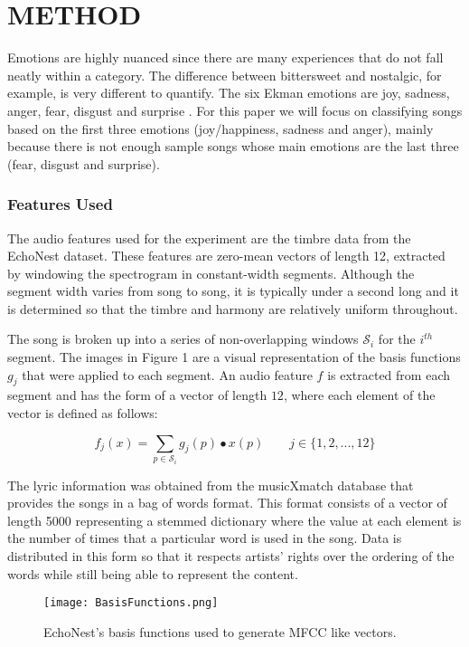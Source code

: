 \renewcommand{\chaptername}{}

\chapter{METHOD}

Emotions are highly nuanced since there are many experiences that do not fall neatly within a category. 
The difference between bittersweet and nostalgic, for example, is very different to quantify. The six Ekman emotions 
are joy, sadness, anger, fear, disgust and surprise \cite{transprose}.  For this paper we will focus on 
classifying songs based on the first three emotions (joy/happiness, sadness and anger), mainly because there is not enough sample songs whose main
emotions are the last three (fear, disgust and surprise).

\subsection*{Features Used}

The audio features used for the experiment are the timbre data from the EchoNest dataset.
These features are zero-mean vectors of length 12,  extracted by windowing the spectrogram in constant-width segments. 
Although the segment width varies from song to song, it is typically under a second long and it is determined
so that the timbre and harmony are relatively uniform throughout.  

The song is broken up into a series of non-overlapping windows $\mathcal{S}_i$ for the $i^{th}$ segment. 
The images in Figure 1 are a visual representation of the basis functions $g_j$ that were applied to each segment. 
An audio feature $f$ is extracted from each segment and has the form of a vector of length $12$,
 where each element of the vector is defined as follows: 

\[ f_j (x) = \sum_{p \in \mathcal{S}_i} g_j(p) \bullet x(p) \qquad j \in \{1, 2, ..., 12\}\]

The lyric information was obtained from the musicXmatch database \cite{musicXmatchDataset} 
that provides the songs in a bag of words format. This format consists  of a vector of length 5000 representing 
a stemmed dictionary where the value at each element is the number of times that a particular word
is used in the song. Data is distributed in this form so that it respects artists' 
rights over the ordering of the words while still being able to represent the content. 

\begin{figure}[h!]
  \centering
      \texttt{[image: BasisFunctions.png]}
  \caption[Compact Routing Example]%
    {EchoNest's basis functions used to generate MFCC like vectors.\protect\footnotemark}

  \end{figure}


